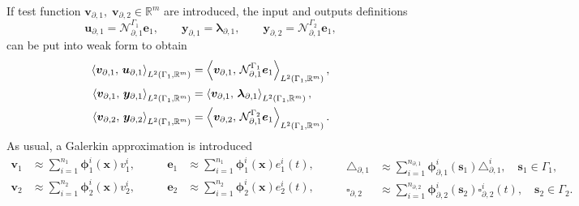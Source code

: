 If test function $\bm{v}_{\partial, 1}, \; \bm{v}_{\partial, 2} \in  \mathbb{R}^m$ are introduced, the input and outputs definitions
\begin{equation}
\bm{u}_{\partial, 1}=\mathcal{N}_{\partial, 1}^{\Gamma_1}\bm{e}_{1}, \qquad \bm{y}_{\partial, 1}=\bm{\lambda}_{\partial, 1}, \qquad \bm{y}_{\partial, 2}=\mathcal{N}_{\partial, 1}^{\Gamma_2}\bm{e}_{1},
\end{equation}  
can be put into weak form to obtain
\begin{equation}\label{eq:inpout_mixed}
\begin{aligned}
\inner[L^2(\Gamma_1, \mathbb{R}^m)]{\bm{v}_{\partial, 1}}{\bm{u}_{\partial, 1}} &= \inner[L^2(\Gamma_1, \mathbb{R}^m)]{\bm{v}_{\partial, 1}}{\mathcal{N}_{\partial, 1}^{\Gamma_1}\bm{e}_{1}}, \\
\inner[L^2(\Gamma_1, \mathbb{R}^m)]{\bm{v}_{\partial, 1}}{\bm{y}_{\partial, 1}} &= \inner[L^2(\Gamma_1, \mathbb{R}^m)]{\bm{v}_{\partial, 1}}{\bm{\lambda}_{\partial, 1}}, \\
\inner[L^2(\Gamma_1, \mathbb{R}^m)]{\bm{v}_{\partial, 2}}{\bm{y}_{\partial, 2}} &= \inner[L^2(\Gamma_1, \mathbb{R}^m)]{\bm{v}_{\partial, 2}}{\mathcal{N}_{\partial, 1}^{\Gamma_2}\bm{e}_{1}}. \\
\end{aligned}
\end{equation}
As usual, a Galerkin approximation is introduced    
\begin{equation}\label{eq:approx_vaeb_mixed}
\begin{aligned}
\bm{v}_1 &\approx \sum_{i=1}^{n_1} \bm{\phi}_1^i(\bm{x}) v_1^i, \\
\bm{v}_2 &\approx \sum_{i=1}^{n_2} \bm{\phi}_2^i(\bm{x}) v_2^i, \\
\end{aligned}  \qquad 
\begin{aligned}
\bm{e}_1 &\approx \sum_{i=1}^{n_1} \bm{\phi}_1^i(\bm{x}) e_1^i(t), \\
\bm{e}_2 &\approx \sum_{i=1}^{n_2} \bm{\phi}_2^i(\bm{x}) e_2^i(t),  \\
\end{aligned} \qquad 
\begin{aligned}
\bm{\triangle}_{\partial, 1} &\approx \sum_{i=1}^{n_{\partial, 1}} \bm{\phi}_{\partial, 1}^i(\bm{s}_1) \triangle_{\partial, 1}^i, \quad \bm{s}_1 \in \Gamma_1, \\
\bm{\square}_{\partial, 2} &\approx \sum_{i=1}^{n_{\partial, 2}} \bm{\phi}_{\partial, 2}^i(\bm{s}_2) \square_{\partial, 2}^i(t), \quad \bm{s}_2 \in \Gamma_2.
\end{aligned}
\end{equation}
